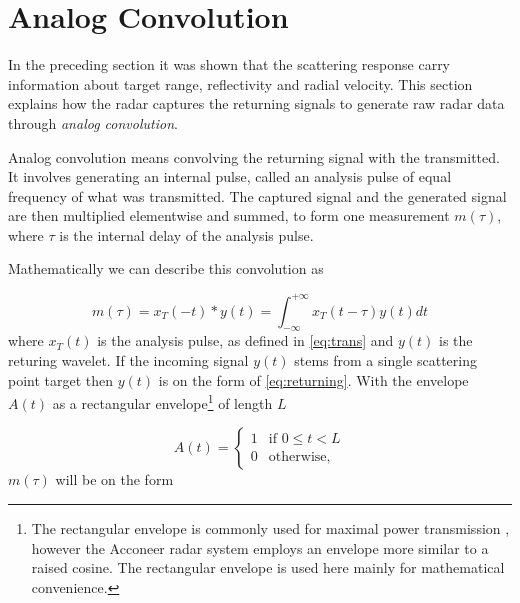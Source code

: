 


\section{Analog Convolution}

In the preceding section it was shown that the scattering response carry information about target range, reflectivity and radial velocity. This section explains how the radar captures the returning signals to generate raw radar data through \emph{analog convolution}.

Analog convolution means convolving the returning signal with the transmitted. It involves generating an internal pulse, called an analysis pulse of equal frequency of what was transmitted. The captured signal and the generated signal are then multiplied elementwise and summed, to form one measurement $m(\tau)$, where $\tau$ is the internal delay of the analysis pulse. 

Mathematically we can describe this convolution as

\begin{equation}
	m(\tau) 
	= x_T(-t) * y(t)
	= \int_{-\infty}^{+\infty} x_T(t - \tau)y(t) dt
\end{equation}
where $x_T(t)$ is the analysis pulse, as defined in \ref{eq:trans} and $y(t)$ is the returing wavelet. If the incoming signal $y(t)$ stems from a single scattering point target then $y(t)$ is on the form of \ref{eq:returning}. With the envelope $A(t)$ as a rectangular envelope\footnote{The rectangular envelope is commonly used for maximal power transmission \citep{richards_2014}, however the Acconeer radar system employs an envelope more similar to a raised cosine. The rectangular envelope is used here mainly for mathematical convenience.} of length $L$

\begin{equation}
	A(t) = \begin{cases}
		1 & \text{if $0\leq t < L$} \\
		0 & \text{otherwise},
	\end{cases}
\end{equation}
$m(\tau)$ will be on the form 

